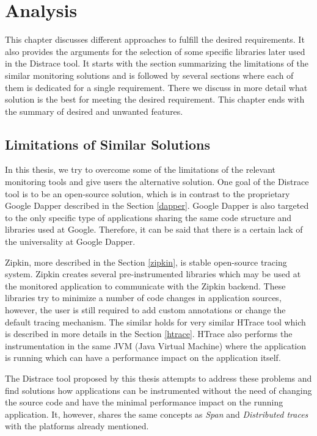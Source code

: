 \chapter{Analysis}
\label{analysis}
This chapter discusses different approaches to fulfill the desired requirements. It also provides the arguments for the selection of some specific libraries later used in the Distrace tool. It starts with the section summarizing the limitations of the similar monitoring solutions and is followed by several sections where each of them is dedicated for a single requirement. There we discuss in more detail what solution is the best for meeting the desired requirement. This chapter ends with the summary of desired and unwanted features.

\section{Limitations of Similar Solutions}
In this thesis, we try to overcome some of the limitations of the relevant monitoring tools and give users the alternative solution. One goal of the Distrace tool is to be an open-source solution, which is in contrast to the proprietary Google Dapper described in the Section \ref{dapper}. Google Dapper is also targeted to the only specific type of applications sharing the same code structure and libraries used at Google. Therefore, it can be said that there is a certain lack of the universality at Google Dapper. 

Zipkin, more described in the Section \ref{zipkin}, is stable open-source tracing system. Zipkin creates several pre-instrumented libraries which may be used at the monitored application to communicate with the Zipkin backend. These libraries try to minimize a number of code changes in application sources, however, the user is still required to add custom annotations or change the default tracing mechanism. The similar holds for very similar HTrace tool which is described in more details in the Section \ref{htrace}. HTrace also performs the instrumentation in the same JVM (Java Virtual Machine) where the application is running which can have a performance impact on the application itself.

The Distrace tool proposed by this thesis attempts to address these problems and find solutions how applications can be instrumented without the need of changing the source code and have the minimal performance impact on the running application. It, however, shares the same concepts as \textit{Span} and\textit{ Distributed traces} with the platforms already mentioned.
